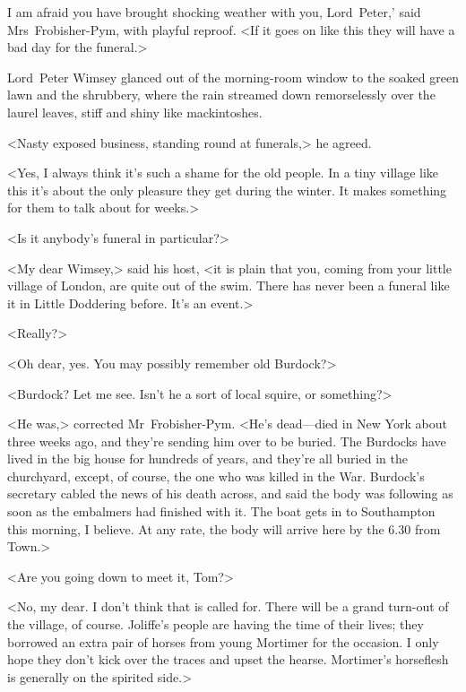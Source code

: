 
\lettrine[lines=4,ante=‘]{I}{} am afraid you have brought shocking weather with you, Lord~Peter,' said Mrs~Frobisher-Pym, with playful reproof. <If it goes on like this they will have a bad day for the funeral.>

\zz
Lord~Peter Wimsey glanced out of the morning-room window to the soaked green lawn and the shrubbery, where the rain streamed down remorselessly over the laurel leaves, stiff and shiny like mackintoshes.

<Nasty exposed business, standing round at funerals,> he agreed.

<Yes, I always think it's such a shame for the old people. In a tiny village like this it's about the only pleasure they get during the winter. It makes something for them to talk about for weeks.>

<Is it anybody's funeral in particular?>

<My dear Wimsey,> said his host, <it is plain that you, coming from your little village of London, are quite out of the swim. There has never been a funeral like it in Little Doddering before. It's an event.>

<Really?>

<Oh dear, yes. You may possibly remember old Burdock?>

<Burdock? Let me see. Isn't he a sort of local squire, or something?>

<He was,> corrected Mr~Frobisher-Pym. <He's dead—died in New York about three weeks ago, and they're sending him over to be buried. The Burdocks have lived in the big house for hundreds of years, and they're all buried in the churchyard, except, of course, the one who was killed in the War. Burdock's secretary cabled the news of his death across, and said the body was following as soon as the embalmers had finished with it. The boat gets in to Southampton this morning, I believe. At any rate, the body will arrive here by the 6.30 from Town.>

<Are you going down to meet it, Tom?>

<No, my dear. I don't think that is called for. There will be a grand turn-out of the village, of course. Joliffe's people are having the time of their lives; they borrowed an extra pair of horses from young Mortimer for the occasion. I only hope they don't kick over the traces and upset the hearse. Mortimer's horseflesh is generally on the spirited side.>

